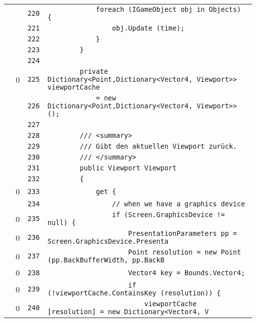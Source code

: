 \documentclass[a4paper,10pt]{article}
\begin{document}
\begin{longtable}[l]{lrrl}
\cellcolor{gray} &  & \verb~220~ & \verb~            foreach (IGameObject obj in Objects) {~\\
\cellcolor{gray} &  & \verb~221~ & \verb~                obj.Update (time);~\\
\cellcolor{gray} &  & \verb~222~ & \verb~            }~\\
\cellcolor{gray} &  & \verb~223~ & \verb~        }~\\
\cellcolor{gray} &  & \verb~224~ & \verb~~\\
\cellcolor{red} & 0 & \verb~225~ & \verb~        private Dictionary<Point,Dictionary<Vector4, Viewport>> viewportCache~\\
\cellcolor{gray} &  & \verb~226~ & \verb~            = new Dictionary<Point,Dictionary<Vector4, Viewport>> ();~\\
\cellcolor{gray} &  & \verb~227~ & \verb~~\\
\cellcolor{gray} &  & \verb~228~ & \verb~        /// <summary>~\\
\cellcolor{gray} &  & \verb~229~ & \verb~        /// Gibt den aktuellen Viewport zurück.~\\
\cellcolor{gray} &  & \verb~230~ & \verb~        /// </summary>~\\
\cellcolor{gray} &  & \verb~231~ & \verb~        public Viewport Viewport~\\
\cellcolor{gray} &  & \verb~232~ & \verb~        {~\\
\cellcolor{red} & 0 & \verb~233~ & \verb~            get {~\\
\cellcolor{gray} &  & \verb~234~ & \verb~                // when we have a graphics device~\\
\cellcolor{red} & 0 & \verb~235~ & \verb~                if (Screen.GraphicsDevice != null) {~\\
\cellcolor{red} & 0 & \verb~236~ & \verb~                    PresentationParameters pp = Screen.GraphicsDevice.Presenta~\\
\cellcolor{red} & 0 & \verb~237~ & \verb~                    Point resolution = new Point (pp.BackBufferWidth, pp.BackB~\\
\cellcolor{red} & 0 & \verb~238~ & \verb~                    Vector4 key = Bounds.Vector4;~\\
\cellcolor{red} & 0 & \verb~239~ & \verb~                    if (!viewportCache.ContainsKey (resolution)) {~\\
\cellcolor{red} & 0 & \verb~240~ & \verb~                        viewportCache [resolution] = new Dictionary<Vector4, V~\\

\end{longtable}
\end{document}
